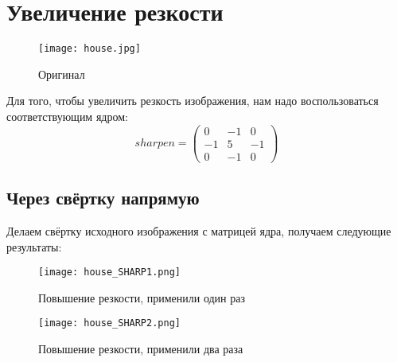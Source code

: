 \chapter{Увеличение резкости}
\label{ch:chap3}


\lstset{style=mystyle}


\begin{figure}[ht]
    \centering
    \texttt{[image: house.jpg]}
	\caption{Оригинал}
\end{figure}

Для того, чтобы увеличить резкость изображения, нам надо воспользоваться соответствующим ядром:
$$
    sharpen = \begin{pmatrix}
        0 & -1 & 0 \\
        -1 & 5 & -1 \\
        0 & -1 & 0 
    \end{pmatrix}
$$

\section{Через свёртку напрямую}
Делаем свёртку исходного изображения с матрицей ядра, получаем следующие результаты:

\begin{figure}[ht]
    \centering
    \texttt{[image: house\_SHARP1.png]}
	\caption{Повышение резкости, применили один раз}
\end{figure}



\begin{figure}[ht]
    \centering
    \texttt{[image: house\_SHARP2.png]}
	\caption{Повышение резкости, применили два раза}
\end{figure}


